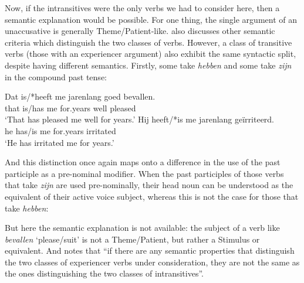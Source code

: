 \documentclass[output=paper]{langscibook}
\begin{document}
Now, if the intransitives were the only verbs we had to consider here, then a
semantic explanation would be possible. For one thing, the single argument of an
unaccusative is generally Theme\slash Patient-like. \citet[132--136]{zaenen93}
also discusses other semantic criteria which distinguish the two classes of
verbs. However, a class of transitive verbs (those with an experiencer argument)
also exhibit the same syntactic split, despite having different semantics.
Firstly, some take \textit{hebben} and some take \textit{zijn} in the compound
past tense:

\ea
\begin{xlist}
  \ex
  \gll  Dat is/*heeft me jarenlang goed bevallen.\\
  that is/has me for.years well pleased\\
  \glt `That has pleased me well for years.' %
  \ex
  \gll Hij heeft/*is me jarenlang geïrriteerd.\\
  he has/is me for.years irritated\\
  \glt `He has irritated me for years.'
\end{xlist}
\z
%
And this distinction once again maps onto a difference in the use of the past
participle as a pre-nominal modifier. When the past participles of those verbs
that take \textit{zijn} are used pre-nominally, their head noun can be
understood as the equivalent of their active voice subject, whereas this is not
the case for those that take \textit{hebben}:

\z

\ea
\begin{xlist}
\end{xlist}
\z
%
But here the semantic explanation is not available: the subject of a verb like
\textit{bevallen} `please\slash suit' is not a Theme\slash Patient, but rather a
Stimulus or equivalent. And \citet[144]{zaenen93} notes that ``if there are any
semantic properties that distinguish the two classes of experiencer verbs under
consideration, they are not the same as the ones distinguishing the two classes
of intransitives''.
\end{document}
